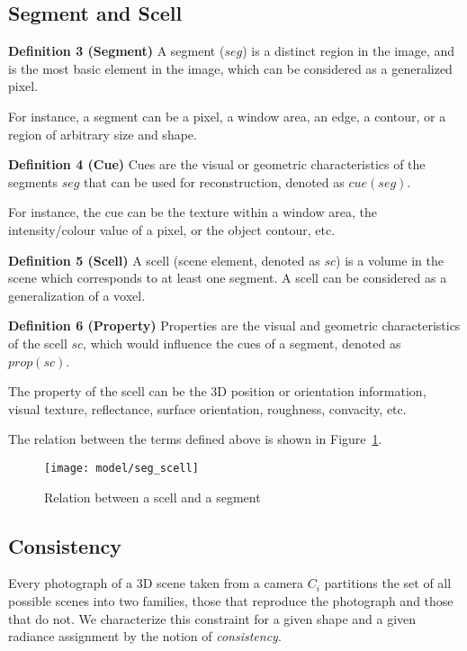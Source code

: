 \subsection{Segment and Scell}
\noindent\textbf{Definition 3 (Segment)} A segment ($seg$) is a distinct region in the image, and is the most basic element in the image, which can be considered as a generalized pixel. 

For instance, a segment can be a pixel, a window area, an edge, a contour, or a region of arbitrary size and shape.

\noindent\textbf{Definition 4 (Cue)} Cues are the visual or geometric characteristics of the segments $seg$ that can be used for reconstruction, denoted as $cue(seg)$.

For instance, the cue can be the texture within a window area, the intensity/colour value of a pixel, or the object contour, etc.

\noindent\textbf{Definition 5 (Scell)} A scell (scene element, denoted as $sc$) is a volume in the scene which corresponds to at least one segment. A scell can be considered as a generalization of a voxel.

\noindent\textbf{Definition 6 (Property)} Properties are the visual and geometric characteristics of the scell $sc$, which would influence the cues of a segment, denoted as $prop(sc)$.

The property of the scell can be the 3D position or orientation information, visual texture, reflectance, surface orientation, roughness, convacity, etc.

The relation between the terms defined above is shown in Figure~\ref{fig:scell_seg}.
\begin{figure}[!htbp]
\centering
\texttt{[image: model/seg\_scell]}
\caption{Relation between a scell and a segment}
\label{fig:scell_seg}
\end{figure}


\subsection{Consistency}
Every photograph of a 3D scene taken from a camera $C_i$ partitions the set of all possible scenes into two families, those that reproduce the photograph and those that do not. We characterize this constraint for a given shape and a given radiance assignment by the notion of \textit{consistency}.

